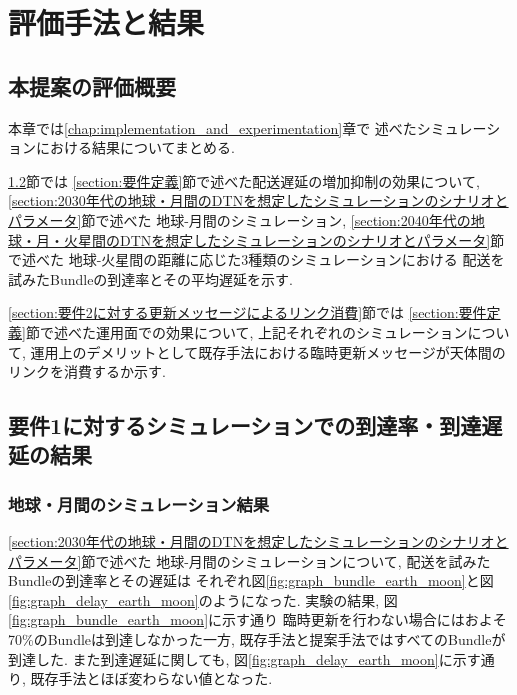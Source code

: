 \chapter{評価手法と結果}
\label{chap:evaluation}
\section{本提案の評価概要}
本章では\ref{chap:implementation_and_experimentation}章で
述べたシミュレーションにおける結果についてまとめる.

\ref{section:要件1に対するシミュレーション結果}節では
\ref{section:要件定義}節で述べた配送遅延の増加抑制の効果について, 
\ref{section:2030年代の地球・月間のDTNを想定したシミュレーションのシナリオとパラメータ}節で述べた
地球-月間のシミュレーション, 
\ref{section:2040年代の地球・月・火星間のDTNを想定したシミュレーションのシナリオとパラメータ}節で述べた
地球-火星間の距離に応じた3種類のシミュレーションにおける
配送を試みたBundleの到達率とその平均遅延を示す. 

\ref{section:要件2に対する更新メッセージによるリンク消費}節では
\ref{section:要件定義}節で述べた運用面での効果について, 
上記それぞれのシミュレーションについて, 
運用上のデメリットとして既存手法における臨時更新メッセージが天体間のリンクを消費するか示す. 

\section{要件1に対するシミュレーションでの到達率・到達遅延の結果}
\label{section:要件1に対するシミュレーション結果}

\subsection{地球・月間のシミュレーション結果}
\label{section:地球・月間のシミュレーション結果}
\ref{section:2030年代の地球・月間のDTNを想定したシミュレーションのシナリオとパラメータ}節で述べた
地球-月間のシミュレーションについて, 配送を試みたBundleの到達率とその遅延は
それぞれ図\ref{fig:graph_bundle_earth_moon}と図\ref{fig:graph_delay_earth_moon}のようになった. 
実験の結果, 図\ref{fig:graph_bundle_earth_moon}に示す通り
臨時更新を行わない場合にはおよそ70\%のBundleは到達しなかった一方, 
既存手法と提案手法ではすべてのBundleが到達した.
また到達遅延に関しても, 図\ref{fig:graph_delay_earth_moon}に示す通り, 
既存手法とほぼ変わらない値となった. 

